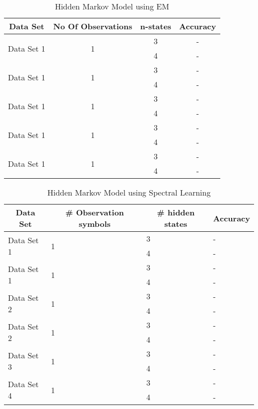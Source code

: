 \documentclass{article} %
\begin{document}
\begin{table}[t]
\caption{Hidden Markov Model using EM}
\label{HMM_EM}
\begin{center}
\begin{tabular}{ |c|c|c|c| }
\hline
\multicolumn{1}{|c|}{\bf Data Set} &\multicolumn{1}{|c|}{\bf No Of Observations} &\multicolumn{1}{|c|}{\bf n-states} &\multicolumn{1}{|c|}{\bf Accuracy}\\
\hline
\multirow{2}{*}{Data Set 1}& \multirow{2}{*}{1} & 3 & - \\
& & 4 & - \\
\hline
\multirow{2}{*}{Data Set 1}& \multirow{2}{*}{1} & 3 & - \\
& & 4 & - \\
\hline
\multirow{2}{*}{Data Set 1}& \multirow{2}{*}{1} & 3 & - \\
& & 4 & - \\
\hline
\multirow{2}{*}{Data Set 1}& \multirow{2}{*}{1} & 3 & - \\
& & 4 & - \\
\hline
\multirow{2}{*}{Data Set 1}& \multirow{2}{*}{1} & 3 & - \\
& & 4 & - \\
\hline
\end{tabular}
\end{center}
\end{table}

\begin{table}[t]
\caption{Hidden Markov Model using Spectral Learning}
\label{Spectral Learning}
\begin{center}
\begin{tabular}{ |l|l|l|l| }
\hline
\multicolumn{1}{|c|}{\bf Data Set} &\multicolumn{1}{|c|}{\bf \# Observation symbols} &\multicolumn{1}{|c|}{\bf \# hidden states} &\multicolumn{1}{|c|}{\bf Accuracy}\\
\hline
\multirow{2}{*}{Data Set 1}& \multirow{2}{*}{1} & 3 & - \\
& & 4 & - \\
\hline
\multirow{2}{*}{Data Set 1}& \multirow{2}{*}{1} & 3 & - \\
& & 4 & - \\
\hline
\multirow{2}{*}{Data Set 2}& \multirow{2}{*}{1} & 3 & - \\
& & 4 & - \\
\hline
\multirow{2}{*}{Data Set 2}& \multirow{2}{*}{1} & 3 & - \\
& & 4 & - \\
\hline
\multirow{2}{*}{Data Set 3}& \multirow{2}{*}{1} & 3 & - \\
& & 4 & - \\
\hline
\multirow{2}{*}{Data Set 4}& \multirow{2}{*}{1} & 3 & - \\
& & 4 & - \\
\hline
\end{tabular}
\end{center}
\end{table}
\end{document}
